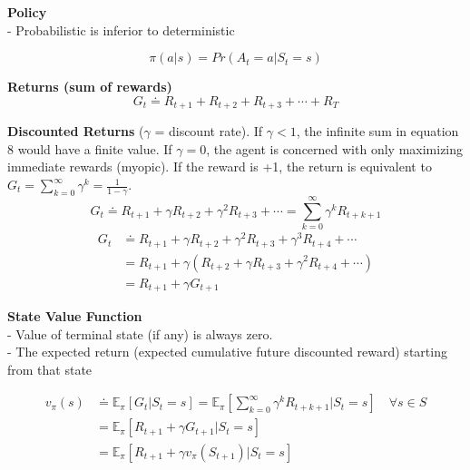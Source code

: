 \documentclass{article}
\begin{document}
\noindent
\textbf{Policy }
\\
- Probabilistic is inferior to deterministic

\begin{equation}
\pi(a | s)= Pr(A_{t} = a | S_{t}=s)
\end{equation}

\noindent
\textbf{Returns (sum of rewards) }
\begin{equation}
G_{t} \doteq R_{t+1}+R_{t+2}+R_{t+3}+\cdots+R_{T}
\end{equation}

\noindent
\textbf{Discounted Returns }
($\gamma$ = discount rate). If $\gamma < 1$, the infinite sum
in equation 8 would have a finite value. If $\gamma = 0$, the agent is concerned
with only maximizing immediate rewards (myopic). If the reward is +1, the return
is equivalent to $G_{t}=\sum_{k=0}^{\infty} \gamma^{k}=\frac{1}{1-\gamma}$.
\begin{equation}
G_{t} \doteq R_{t+1}+\gamma R_{t+2}+\gamma^{2} R_{t+3}+\cdots=\sum_{k=0}^{\infty} \gamma^{k} R_{t+k+1}
\end{equation}
\begin{equation}
\begin{aligned}
G_{t} & \doteq R_{t+1}+\gamma R_{t+2}+\gamma^{2} R_{t+3}+\gamma^{3} R_{t+4}+\cdots \\
&=R_{t+1}+\gamma\left(R_{t+2}+\gamma R_{t+3}+\gamma^{2} R_{t+4}+\cdots\right) \\
&=R_{t+1}+\gamma G_{t+1}
\end{aligned}
\end{equation}

\noindent
\textbf{State Value Function}\\
- Value of terminal state (if any) is always zero.\\
- The expected return (expected cumulative future discounted reward) starting
from that state

\begin{equation}
\begin{aligned}
v_{\pi}(s) &\doteq \mathbb{E}_{\pi}[G_{t} | S_{t}=s]=\mathbb{E}_{\pi}[\sum_{k=0}^{\infty} \gamma^{k} R_{t+k+1} | S_{t}=s] \quad \forall s \in S\\
&=\mathbb{E}_{\pi}\left[R_{t+1}+\gamma G_{t+1} | S_{t}=s\right] \\
&=\mathbb{E}_{\pi}\left[R_{t+1}+\gamma v_{\pi}\left(S_{t+1}\right) | S_{t}=s\right]
\end{aligned}
\end{equation}
\end{document}
